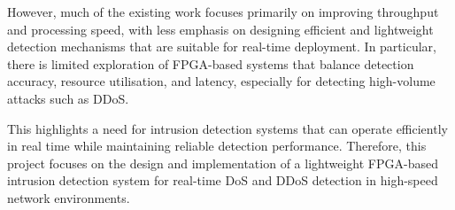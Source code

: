 However, much of the existing work focuses primarily on improving throughput and processing speed, with less emphasis on designing efficient and lightweight detection mechanisms that are suitable for real-time deployment. In particular, there is limited exploration of FPGA-based systems that balance detection accuracy, resource utilisation, and latency, especially for detecting high-volume attacks such as DDoS.

This highlights a need for intrusion detection systems that can operate efficiently in real time while maintaining reliable detection performance. Therefore, this project focuses on the design and implementation of a lightweight FPGA-based intrusion detection system for real-time DoS and DDoS detection in high-speed network environments.

